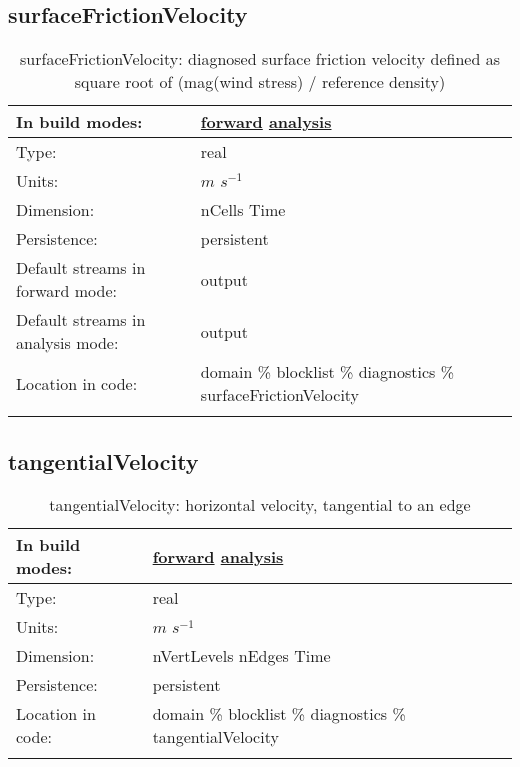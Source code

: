 \subsection[surfaceFrictionVelocity]{surfaceFrictionVelocity}
\label{subsec:var_sec_diagnostics_surfaceFrictionVelocity}
\begin{center}
\begin{longtable}{| p{2.0in} | p{4.0in} |}
        \hline 
        In build modes: & \hyperref[subsec:forward_var_tab_diagnostics]{forward} \hyperref[subsec:analysis_var_tab_diagnostics]{analysis} \\
        \hline 
        Type: & real \\
        \hline 
        Units: & $m$ $s^{-1}$ \\
        \hline 
        Dimension: & nCells Time \\
        \hline 
        Persistence: & persistent \\
        \hline 
		 Default streams in forward mode: &  output \\
        \hline 
		 Default streams in analysis mode: &  output \\
        \hline 
		 Location in code: & domain \% blocklist \% diagnostics \% surfaceFrictionVelocity \\
		 \hline 
    \caption{surfaceFrictionVelocity: diagnosed surface friction velocity defined as square root of (mag(wind stress) / reference density)}
\end{longtable}
\end{center}
\subsection[tangentialVelocity]{tangentialVelocity}
\label{subsec:var_sec_diagnostics_tangentialVelocity}
\begin{center}
\begin{longtable}{| p{2.0in} | p{4.0in} |}
        \hline 
        In build modes: & \hyperref[subsec:forward_var_tab_diagnostics]{forward} \hyperref[subsec:analysis_var_tab_diagnostics]{analysis} \\
        \hline 
        Type: & real \\
        \hline 
        Units: & $m$ $s^{-1}$ \\
        \hline 
        Dimension: & nVertLevels nEdges Time \\
        \hline 
        Persistence: & persistent \\
        \hline 
		 Location in code: & domain \% blocklist \% diagnostics \% tangentialVelocity \\
		 \hline 
    \caption{tangentialVelocity: horizontal velocity, tangential to an edge}
\end{longtable}
\end{center}
